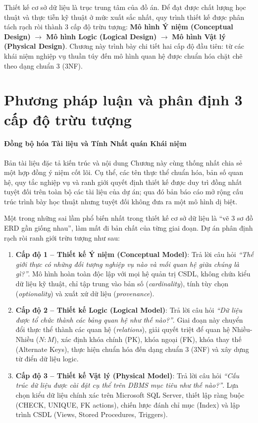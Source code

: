 
Thiết kế cơ sở dữ liệu là trục trung tâm của đồ án. Để đạt được chất lượng học thuật và thực tiễn kỹ thuật ở mức xuất sắc nhất, quy trình thiết kế được phân tách rạch ròi thành 3 cấp độ trừu tượng: \textbf{Mô hình Ý niệm (Conceptual Design)} $\rightarrow$ \textbf{Mô hình Logic (Logical Design)} $\rightarrow$ \textbf{Mô hình Vật lý (Physical Design)}. Chương này trình bày chi tiết hai cấp độ đầu tiên: từ các khái niệm nghiệp vụ thuần túy đến mô hình quan hệ được chuẩn hóa chặt chẽ theo dạng chuẩn 3 (3NF).

\section{Phương pháp luận và phân định 3 cấp độ trừu tượng}
\label{s:c4_methodology}

\paragraph{Đồng bộ hóa Tài liệu và Tính Nhất quán Khái niệm}
Bản tài liệu đặc tả kiến trúc và nội dung Chương này cùng thống nhất chia sẻ một hợp đồng ý niệm cốt lõi. Cụ thể, các tên thực thể chuẩn hóa, bản số quan hệ, quy tắc nghiệp vụ và ranh giới quyết định thiết kế được duy trì đồng nhất tuyệt đối trên toàn bộ các tài liệu của dự án; qua đó bản báo cáo mở rộng cấu trúc trình bày học thuật nhưng tuyệt đối không đưa ra một mô hình dị biệt.

Một trong những sai lầm phổ biến nhất trong thiết kế cơ sở dữ liệu là ``vẽ 3 sơ đồ ERD gần giống nhau'', làm mất đi bản chất của từng giai đoạn. Dự án phân định rạch ròi ranh giới trừu tượng như sau:

\begin{enumerate}
    \item \textbf{Cấp độ 1 -- Thiết kế Ý niệm (Conceptual Model)}: Trả lời câu hỏi \textit{``Thế giới thực có những đối tượng nghiệp vụ nào và mối quan hệ giữa chúng là gì?''}. Mô hình hoàn toàn độc lập với mọi hệ quản trị CSDL, không chứa kiểu dữ liệu kỹ thuật, chỉ tập trung vào bản số (\textit{cardinality}), tính tùy chọn (\textit{optionality}) và xuất xứ dữ liệu (\textit{provenance}).
    \item \textbf{Cấp độ 2 -- Thiết kế Logic (Logical Model)}: Trả lời câu hỏi \textit{``Dữ liệu được tổ chức thành các bảng quan hệ như thế nào?''}. Giai đoạn này chuyển đổi thực thể thành các quan hệ (\textit{relations}), giải quyết triệt để quan hệ Nhiều-Nhiều ($N:M$), xác định khóa chính (PK), khóa ngoại (FK), khóa thay thế (Alternate Keys), thực hiện chuẩn hóa đến dạng chuẩn 3 (3NF) và xây dựng từ điển dữ liệu logic.
    \item \textbf{Cấp độ 3 -- Thiết kế Vật lý (Physical Model)}: Trả lời câu hỏi \textit{``Cấu trúc dữ liệu được cài đặt cụ thể trên DBMS mục tiêu như thế nào?''}. Lựa chọn kiểu dữ liệu chính xác trên Microsoft SQL Server, thiết lập ràng buộc (CHECK, UNIQUE, FK actions), chiến lược đánh chỉ mục (Index) và lập trình CSDL (Views, Stored Procedures, Triggers).
\end{enumerate}

